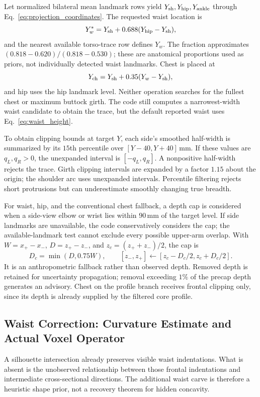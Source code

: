 \documentclass[11pt,a4paper]{article}
\numberwithin{equation}{section}
\begin{document}
Let normalized bilateral mean landmark rows yield $Y_{\rm sh},Y_{\rm hip},Y_{\rm ankle}$ through Eq.~\eqref{eq:projection_coordinates}. The requested waist location is
\begin{equation}
Y_w^*=Y_{\rm sh}+0.688(Y_{\rm hip}-Y_{\rm sh}),
\label{eq:waist_height}
\end{equation}
and the nearest available torso-trace row defines $Y_w$. The fraction approximates $(0.818-0.620)/(0.818-0.530)$; these are anatomical proportions used as priors, not individually detected waist landmarks. Chest is placed at
\begin{equation}
Y_{\rm ch}=Y_{\rm sh}+0.35(Y_w-Y_{\rm sh}),
\label{eq:chest_height}
\end{equation}
and hip uses the hip landmark level. Neither operation searches for the fullest chest or maximum buttock girth. The code still computes a narrowest-width waist candidate to obtain the trace, but the default reported waist uses Eq.~\eqref{eq:waist_height}.

To obtain clipping bounds at target $Y$, each side's smoothed half-width is summarized by its $15$th percentile over $[Y-40,Y+40]$\,mm. If these values are $q_L,q_R>0$, the unexpanded interval is $[-q_L,q_R]$. A nonpositive half-width rejects the trace. Girth clipping intervals are expanded by a factor $1.15$ about the origin; the shoulder arc uses unexpanded intervals. Percentile filtering rejects short protrusions but can underestimate smoothly changing true breadth.

For waist, hip, and the conventional chest fallback, a depth cap is considered when a side-view elbow or wrist lies within $90$\,mm of the target level. If side landmarks are unavailable, the code conservatively considers the cap; the available-landmark test cannot exclude every possible upper-arm overlap. With $W=x_+-x_-$, $D=z_+-z_-$, and $z_c=(z_++z_-)/2$, the cap is
\begin{equation}
D_c=\min(D,0.75W),\qquad [z_-,z_+]\leftarrow[z_c-D_c/2,z_c+D_c/2].
\end{equation}
It is an anthropometric fallback rather than observed depth. Removed depth is retained for uncertainty propagation; removal exceeding $1\%$ of the precap depth generates an advisory. Chest on the profile branch receives frontal clipping only, since its depth is already supplied by the filtered core profile.

\subsection{Waist Correction: Curvature Estimate and Actual Voxel Operator}
\label{subsec:waist_correction}
A silhouette intersection already preserves visible waist indentations. What is absent is the unobserved relationship between those frontal indentations and intermediate cross-sectional directions. The additional waist carve is therefore a heuristic shape prior, not a recovery theorem for hidden concavity.
\end{document}
